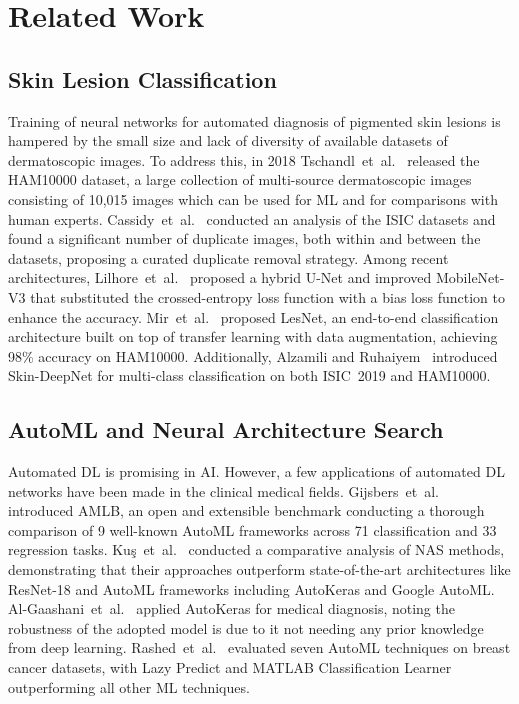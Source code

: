 \documentclass[conference]{IEEEtran}
\begin{document}
\section{Related Work}
 
\subsection{Skin Lesion Classification}
 
Training of neural networks for automated diagnosis of pigmented skin lesions is hampered by the small size and lack of diversity of available datasets of dermatoscopic images. To address this, in 2018 Tschandl~et~al.~\cite{b12} released the HAM10000 dataset, a large collection of multi-source dermatoscopic images consisting of 10,015 images which can be used for ML and for comparisons with human experts. Cassidy~et~al.~\cite{b13} conducted an analysis of the ISIC datasets and found a significant number of duplicate images, both within and between the datasets, proposing a curated duplicate removal strategy. Among recent architectures, Lilhore~et~al.~\cite{b14} proposed a hybrid U-Net and improved MobileNet-V3 that substituted the crossed-entropy loss function with a bias loss function to enhance the accuracy. Mir~et~al.~\cite{b15} proposed LesNet, an end-to-end classification architecture built on top of transfer learning with data augmentation, achieving 98\% accuracy on HAM10000. Additionally, Alzamili and Ruhaiyem~\cite{b16} introduced Skin-DeepNet for multi-class classification on both ISIC~2019 and HAM10000.
 
\subsection{AutoML and Neural Architecture Search}
 
Automated DL is promising in AI. However, a few applications of automated DL networks have been made in the clinical medical fields. Gijsbers~et~al.~\cite{b17} introduced AMLB, an open and extensible benchmark conducting a thorough comparison of 9 well-known AutoML frameworks across 71 classification and 33 regression tasks. Ku\c{s}~et~al.~\cite{b18} conducted a comparative analysis of NAS methods, demonstrating that their approaches outperform state-of-the-art architectures like ResNet-18 and AutoML frameworks including AutoKeras and Google AutoML. Al-Gaashani~et~al.~\cite{b19} applied AutoKeras for medical diagnosis, noting the robustness of the adopted model is due to it not needing any prior knowledge from deep learning. Rashed~et~al.~\cite{b20} evaluated seven AutoML techniques on breast cancer datasets, with Lazy Predict and MATLAB Classification Learner outperforming all other ML techniques.
 
\end{document}
